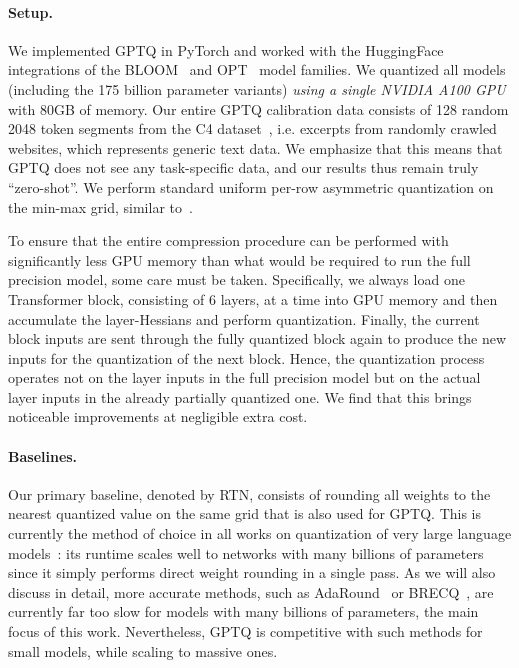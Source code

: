 \paragraph{Setup.} We implemented GPTQ in PyTorch \cite{paszke2019pytorch} and worked with the HuggingFace integrations of the BLOOM~\cite{laurencconbigscience} and OPT~\cite{zhang2022opt} model families. We quantized all models (including the 175 billion parameter variants) \emph{using a single NVIDIA A100 GPU} with 80GB of memory. Our entire GPTQ calibration data consists of 128 random 2048 token segments from the C4 dataset~\cite{C4}, i.e. excerpts from randomly crawled websites, which represents generic text data. We emphasize that this means that GPTQ does not see any task-specific data, and our results thus remain truly ``zero-shot''. We perform standard uniform per-row asymmetric quantization on the min-max grid, similar to~\cite{dettmers2022llm}.

To ensure that the entire compression procedure can be performed with significantly less GPU memory than what would be required to run the full precision model, some care must be taken. Specifically, we always load one Transformer block, consisting of 6 layers, at a time into GPU memory and then accumulate the layer-Hessians and perform quantization. Finally, the current block inputs are sent through the fully quantized block again to produce the new inputs for the quantization of the next block. Hence, the quantization process operates not on the layer inputs in the full precision model but on the actual layer inputs in the already partially quantized one. We find that this brings noticeable improvements at negligible extra cost.

\paragraph{Baselines.} Our primary baseline, denoted by RTN, consists of rounding all weights to the nearest quantized value on the same grid that is also used for GPTQ. This is currently the method of choice in all works on quantization of very large language models~\cite{dettmers2022llm, yao2022zeroquant, park2022nuqmm}: its runtime scales well to networks with many billions of parameters since it simply performs direct weight rounding in a single pass. As we will also discuss in detail, more accurate methods, such as AdaRound~\cite{nagel2020up} or BRECQ~\cite{li2021brecq}, are currently far too slow for models with many billions of parameters, the main focus of this work. Nevertheless, GPTQ is competitive with such methods for small models, while scaling to massive ones.

